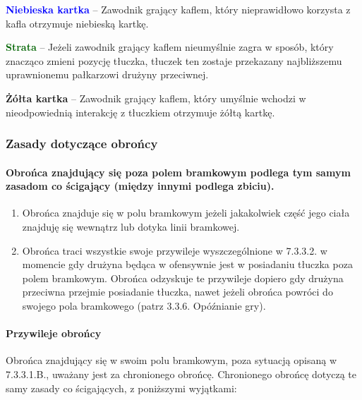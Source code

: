 \documentclass[12pt]{article}
\newcommand\yellowcard[1]{\bgroup\textcolor{darkyellow}{\textbf{#1}}}
\newcommand\bluecard[1]{\bgroup\textcolor{blue}{\textbf{#1}}}
\newcommand\other[1]{\bgroup\textcolor{darkgreen}{\textbf{#1}}}
\begin{document}
\bluecard{Niebieska kartka} -- Zawodnik grający kaflem, który nieprawidłowo
korzysta z kafla otrzymuje niebieską kartkę.

\other{Strata} -- Jeżeli zawodnik grający kaflem nieumyślnie zagra w
sposób, który znacząco zmieni pozycję tłuczka, tłuczek ten zostaje
przekazany najbliższemu uprawnionemu pałkarzowi drużyny przeciwnej.

\yellowcard{Żółta kartka} -- Zawodnik grający kaflem, który umyślnie wchodzi w
nieodpowiednią interakcję z tłuczkiem otrzymuje żółtą kartkę.

\subsubsection{Zasady dotyczące obrońcy}

\paragraph{Obrońca znajdujący się poza polem bramkowym podlega
	tym samym zasadom co ścigający (między innymi podlega zbiciu).}

\begin{enumerate}
	\item
	      Obrońca znajduje się w polu bramkowym jeżeli jakakolwiek część jego
	      ciała znajduję się wewnątrz lub dotyka linii bramkowej.
	\item
	      Obrońca traci wszystkie swoje przywileje wyszczególnione w 7.3.3.2. w
	      momencie gdy drużyna będąca w ofensywnie jest w posiadaniu tłuczka
	      poza polem bramkowym. Obrońca odzyskuje te przywileje dopiero gdy
	      drużyna przeciwna przejmie posiadanie tłuczka, nawet jeżeli obrońca
	      powróci do swojego pola bramkowego (patrz 3.3.6. Opóźnianie gry).
\end{enumerate}

\paragraph{Przywileje obrońcy}
Obrońca znajdujący się w swoim
polu bramkowym, poza sytuacją opisaną w 7.3.3.1.B., uważany jest za
chronionego obrońcę. Chronionego obrońcę dotyczą te samy zasady co
ścigających, z poniższymi wyjątkami:
\end{document}
